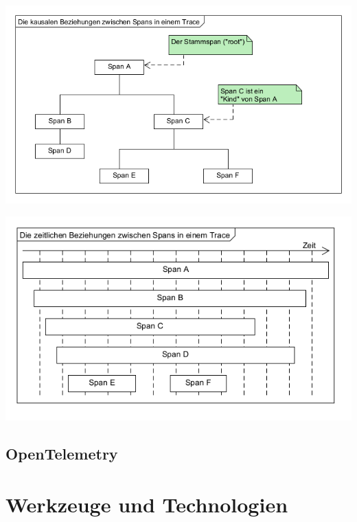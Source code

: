 \begin{minipage}{.47\textwidth}
	\centering
	\includegraphics[width=\linewidth]{img/03_methoden/otel_causal-relationship.png}
	\label{fig:otel-causal-relationship}
\end{minipage}%
\hspace{.06\textwidth}
\begin{minipage}{.47\textwidth}
	\centering
	\includegraphics[width=\linewidth]{img/03_methoden/otel_temporal-relationship}
	\label{fig:otel-temporal-relationship}
\end{minipage}

\subsection{OpenTelemetry}
\label{subsec:opentelemetry}




\section{Werkzeuge und Technologien}
\label{sec:werkzeuge-und-technologien}
